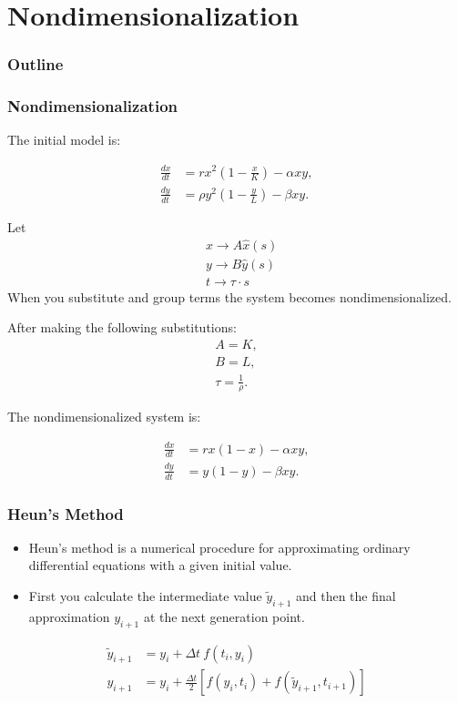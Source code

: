 
\section{Nondimensionalization}
\begin{frame}
  \frametitle{Outline}
  \tableofcontents[ currentsection ]
\end{frame}

\begin{frame}
\frametitle{Nondimensionalization}

The initial model is:

  \begin{align*}
    \frac{dx}{dt} & = rx^2 \left(1-\frac{x}{K}\right) - \alpha xy, \\
    \frac{dy}{dt} & = \rho y^2 \left(1-\frac{y}{L}\right) - \beta xy.
  \end{align*}
	
Let 
\begin{align*}
		& x \rightarrow A \hat{x} (s) \\
		& y \rightarrow B \hat{y} (s) \\
		& t \rightarrow \tau \cdot s
\end{align*}
When you substitute and group terms the system becomes nondimensionalized. 
\end{frame}

\begin{frame}
After making the following substitutions: \\
\begin{align*}
		A = K, \\
		B = L, \\
		\tau = \frac{1}{\rho}.	
\end{align*}

The nondimensionalized system is:

	\begin{align*}
		\frac{d{x}}{dt} &= rx(1-x) - \alpha xy, \\
		\frac{d{y}}{dt} &= y(1-y) - \beta xy.
	\end{align*}
\end{frame}


\begin{frame}
\frametitle{Heun's Method}
\begin{itemize}
\item Heun's method is a numerical procedure for approximating ordinary differential equations with a given initial value.
\item First you calculate the intermediate value $\tilde{y}_{i+1}$ and then the final approximation $y_{i+1}$ at the next generation point.
\end{itemize}

\begin{align*}
	\tilde{y}_{i+1} &= y_i + \Delta t \ f(t_i, y_i) \\
	y_{i+1} &= y_i + \frac{\Delta t}{2} \left[f(y_i,t_i) + f(\tilde{y}_{i+1}, t_{i+1})\right]
\end{align*}
\end{frame}


